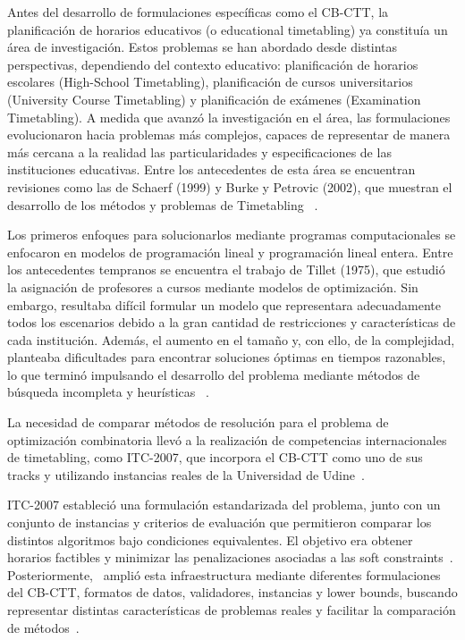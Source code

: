 \documentclass[letter, 10pt]{article}
\begin{document}
Antes del desarrollo de formulaciones espec\'ificas como el CB-CTT, la planificaci\'on de horarios educativos (o educational timetabling) ya constitu\'ia un \'area de investigaci\'on. Estos problemas se han abordado desde distintas perspectivas, dependiendo del contexto educativo: planificaci\'on de horarios escolares (High-School Timetabling), planificaci\'on de cursos universitarios (University Course Timetabling) y planificaci\'on de ex\'amenes (Examination Timetabling). A medida que avanz\'o la investigaci\'on en el \'area, las formulaciones evolucionaron hacia problemas m\'as complejos, capaces de representar de manera m\'as cercana a la realidad las particularidades y especificaciones de las instituciones educativas. Entre los antecedentes de esta \'area se encuentran revisiones como las de Schaerf (1999) y Burke y Petrovic (2002), que muestran el desarrollo de los m\'etodos y problemas de Timetabling ~\cite{Ceschia2023Educational}.

Los primeros enfoques para solucionarlos mediante programas computacionales se enfocaron en modelos de programaci\'on lineal y programaci\'on lineal entera. Entre los antecedentes tempranos se encuentra el trabajo de Tillet (1975), que estudi\'o la asignaci\'on de profesores a cursos mediante modelos de optimizaci\'on. Sin embargo, resultaba dif\'icil formular un modelo que representara adecuadamente todos los escenarios debido a la gran cantidad de restricciones y caracter\'isticas de cada instituci\'on. Adem\'as, el aumento en el tama\~no y, con ello, de la complejidad, planteaba dificultades para encontrar soluciones \'optimas en tiempos razonables, lo que termin\'o impulsando el desarrollo del problema mediante m\'etodos de b\'usqueda incompleta y heur\'isticas ~\cite{Cosar2022Greedy}.


La necesidad de comparar m\'etodos de resoluci\'on para el problema de optimizaci\'on combinatoria  llev\'o a la realizaci\'on de competencias internacionales de timetabling, como ITC-2007, que incorpora el CB-CTT como uno de sus tracks y utilizando instancias reales de la Universidad de Udine~\cite{Ceschia2023Educational,DiGaspero2007ITC}.

ITC-2007 estableci\'o una formulaci\'on estandarizada del problema, junto con un conjunto de instancias y criterios de evaluaci\'on que permitieron comparar los distintos algoritmos bajo condiciones equivalentes. El objetivo era obtener horarios factibles y minimizar las penalizaciones asociadas a las soft constraints~\cite{DiGaspero2007ITC}. Posteriormente,~\cite{Bonutti2012Benchmarking} ampli\'o esta infraestructura mediante diferentes formulaciones del CB-CTT, formatos de datos, validadores, instancias y lower bounds, buscando representar distintas caracter\'isticas de problemas reales y facilitar la comparaci\'on de m\'etodos~\cite{Bonutti2012Benchmarking}.
\end{document}
